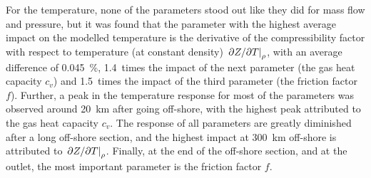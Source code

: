 For the temperature, none of the parameters stood out like they did for mass flow and pressure, but it was found that the parameter with the highest average impact on the modelled temperature is the derivative of the compressibility factor with respect to temperature (at constant density) $\eval{\partial Z/\partial T}_\rho$, with an average difference of \SI{0.045}{\percent}, 1.4~times the impact of the next parameter (the gas heat capacity $c_v$) and 1.5~times the impact of the third parameter (the friction factor $f$). Further, a peak in the temperature response for most of the parameters was observed around \SI{20}{\kilo\meter} after going off-shore, with the highest peak attributed to the gas heat capacity $c_v$. %
The response of all parameters are greatly diminished after a long off-shore section, and the highest impact at \SI{300}{\kilo\meter} off-shore is attributed to $\eval{\partial Z/\partial T}_\rho$. Finally, at the end of the off-shore section, and at the outlet, the most important parameter is the friction factor $f$.

